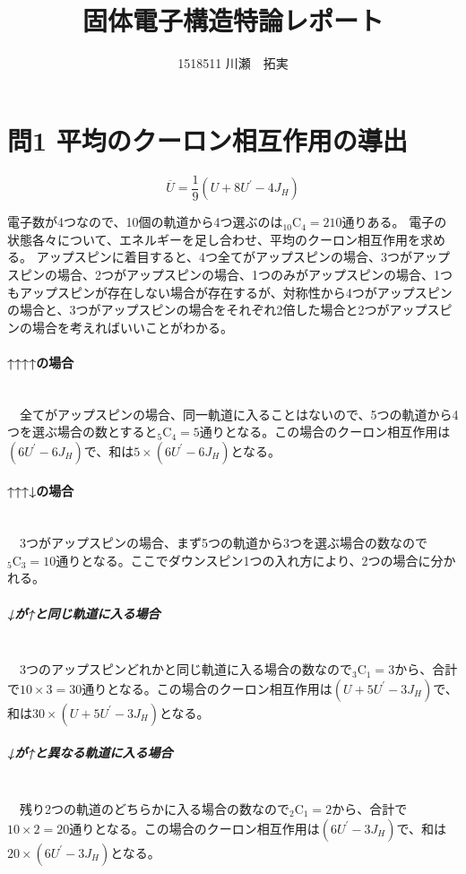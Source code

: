 \documentclass{jsarticle}
\begin{document}
\title{固体電子構造特論レポート}
\author{1518511 川瀬　拓実}
\maketitle

\newpage

\section{問1 平均のクーロン相互作用の導出}

\[
\overline{U} = \frac{1}{9} (U + 8U^{\prime} - 4J_H)  
\]

電子数が4つなので、10個の軌道から4つ選ぶのは${}_{10} \mathrm{C} _4 = 210$通りある。
電子の状態各々について、エネルギーを足し合わせ、平均のクーロン相互作用を求める。
アップスピンに着目すると、4つ全てがアップスピンの場合、3つがアップスピンの場合、2つがアップスピンの場合、1つのみがアップスピンの場合、1つもアップスピンが存在しない場合が存在するが、対称性から4つがアップスピンの場合と、3つがアップスピンの場合をそれぞれ2倍した場合と2つがアップスピンの場合を考えればいいことがわかる。

\paragraph{↑↑↑↑の場合}
\mbox{}\\
　全てがアップスピンの場合、同一軌道に入ることはないので、5つの軌道から4つを選ぶ場合の数とすると${}_{5} \mathrm{C} _4 = 5$通りとなる。この場合のクーロン相互作用は$(6U^{\prime}-6J_H)$で、和は$5 \times (6U^{\prime} - 6J_H)$となる。

\paragraph{↑↑↑↓の場合}
\mbox{}\\
　3つがアップスピンの場合、まず5つの軌道から3つを選ぶ場合の数なので${}_{5} \mathrm{C} _ 3 = 10$通りとなる。ここでダウンスピン1つの入れ方により、2つの場合に分かれる。

\subparagraph{↓が↑と同じ軌道に入る場合}
\mbox{}\\
　3つのアップスピンどれかと同じ軌道に入る場合の数なので${}_{3} \mathrm{C} _ 1 = 3$から、合計で$10 \times 3 = 30$通りとなる。この場合のクーロン相互作用は$(U+5U^{\prime}-3J_H)$で、和は$30 \times (U+5U^{\prime}-3J_H)$となる。

\subparagraph{↓が↑と異なる軌道に入る場合}
\mbox{}\\
　残り2つの軌道のどちらかに入る場合の数なので${}_{2} \mathrm{C} _ 1 = 2$から、合計で$10 \times 2 = 20$通りとなる。この場合のクーロン相互作用は$(6U^{\prime}-3J_H)$で、和は$20 \times (6U^{\prime}-3J_H)$となる。
\end{document}
